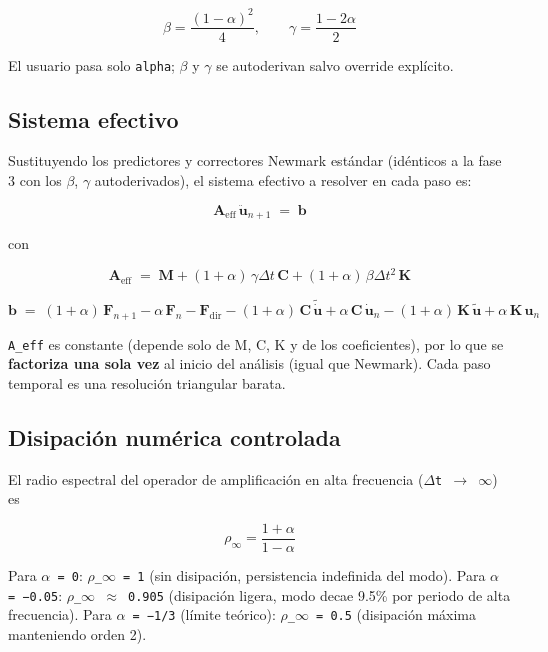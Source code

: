 \documentclass[11pt,letterpaper,oneside]{report}
\begin{document}
\[
\beta = \frac{(1-\alpha)^2}{4}, \qquad \gamma = \frac{1-2\alpha}{2}
\]

El usuario pasa solo \texttt{alpha}; \ensuremath{\beta} y \ensuremath{\gamma} se autoderivan salvo override explícito.

\subsection{Sistema efectivo}

Sustituyendo los predictores y correctores Newmark estándar (idénticos a la
fase 3 con los \ensuremath{\beta}, \ensuremath{\gamma} autoderivados), el sistema efectivo a resolver en cada
paso es:

\[
\mathbf A_\text{eff} \,\ddot{\mathbf u}_{n+1} \;=\; \mathbf b
\]

con

\[
\mathbf A_\text{eff} \;=\; \mathbf M + (1+\alpha)\,\gamma\Delta t\,\mathbf C + (1+\alpha)\,\beta\Delta t^2\,\mathbf K
\]

\[
\mathbf b \;=\; (1+\alpha)\,\mathbf F_{n+1} - \alpha\,\mathbf F_n
              - \mathbf F_\text{dir}
              - (1+\alpha)\,\mathbf C\,\tilde{\dot{\mathbf u}} + \alpha\,\mathbf C\,\dot{\mathbf u}_n
              - (1+\alpha)\,\mathbf K\,\tilde{\mathbf u} + \alpha\,\mathbf K\,\mathbf u_n
\]

\texttt{A\_eff} es constante (depende solo de M, C, K y de los coeficientes), por lo
que se \textbf{factoriza una sola vez} al inicio del análisis (igual que Newmark).
Cada paso temporal es una resolución triangular barata.

\subsection{Disipación numérica controlada}

El radio espectral del operador de amplificación en alta frecuencia
(\texttt{\ensuremath{\Delta}t \ensuremath{\to} \ensuremath{\infty}}) es

\[
\rho_\infty = \frac{1+\alpha}{1-\alpha}
\]

Para \texttt{\ensuremath{\alpha} = 0}: \texttt{\ensuremath{\rho}\_\ensuremath{\infty} = 1} (sin disipación, persistencia indefinida del modo).
Para \texttt{\ensuremath{\alpha} = −0.05}: \texttt{\ensuremath{\rho}\_\ensuremath{\infty} \ensuremath{\approx} 0.905} (disipación ligera, modo decae 9.5\% por
periodo de alta frecuencia). Para \texttt{\ensuremath{\alpha} = −1/3} (límite teórico): \texttt{\ensuremath{\rho}\_\ensuremath{\infty} = 0.5}
(disipación máxima manteniendo orden 2).
\end{document}

